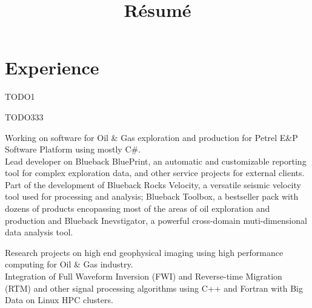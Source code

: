 \documentclass[11pt, a4paper, sans]{moderncv} %
\title{R\'esum\'e}
\begin{document}
\makecvtitle %




\section{Experience}

{
TODO1
}

{
TODO333
}

{
Working on software for Oil \& Gas exploration and production for Petrel E\&P Software Platform using mostly C\#.\\ 
Lead developer on  Blueback BluePrint, an automatic and customizable reporting tool for complex exploration data, and other service projects for external clients.\\
Part of the development of Blueback Rocks Velocity, a versatile seismic velocity tool used for processing and analysis;  Blueback Toolbox, a bestseller pack with dozens of products encopassing most of the areas of oil exploration and production and Blueback Inevstigator, a powerful cross-domain muti-dimensional data analysis tool.
}


{
Research projects on high end geophysical imaging using high performance computing for Oil \& Gas industry.\\
Integration of Full Waveform Inversion (FWI) and Reverse-time Migration (RTM) and other signal processing algorithms using C++ and Fortran with Big Data on Linux HPC clusters.
}
\end{document}
